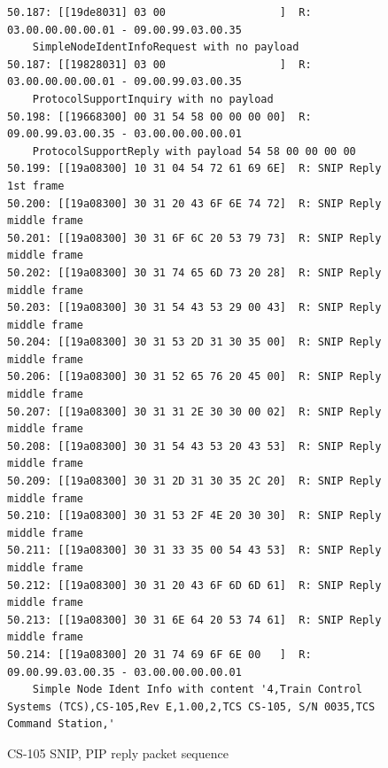 \documentclass[11pt]{article}
\begin{document}
\begin{figure}[!htbp]
\begin{verbatim}
50.187: [[19de8031] 03 00                  ]  R: 03.00.00.00.00.01 - 09.00.99.03.00.35 
    SimpleNodeIdentInfoRequest with no payload
50.187: [[19828031] 03 00                  ]  R: 03.00.00.00.00.01 - 09.00.99.03.00.35 
    ProtocolSupportInquiry with no payload
50.198: [[19668300] 00 31 54 58 00 00 00 00]  R: 09.00.99.03.00.35 - 03.00.00.00.00.01 
    ProtocolSupportReply with payload 54 58 00 00 00 00
50.199: [[19a08300] 10 31 04 54 72 61 69 6E]  R: SNIP Reply 1st frame
50.200: [[19a08300] 30 31 20 43 6F 6E 74 72]  R: SNIP Reply middle frame
50.201: [[19a08300] 30 31 6F 6C 20 53 79 73]  R: SNIP Reply middle frame
50.202: [[19a08300] 30 31 74 65 6D 73 20 28]  R: SNIP Reply middle frame
50.203: [[19a08300] 30 31 54 43 53 29 00 43]  R: SNIP Reply middle frame
50.204: [[19a08300] 30 31 53 2D 31 30 35 00]  R: SNIP Reply middle frame
50.206: [[19a08300] 30 31 52 65 76 20 45 00]  R: SNIP Reply middle frame
50.207: [[19a08300] 30 31 31 2E 30 30 00 02]  R: SNIP Reply middle frame
50.208: [[19a08300] 30 31 54 43 53 20 43 53]  R: SNIP Reply middle frame
50.209: [[19a08300] 30 31 2D 31 30 35 2C 20]  R: SNIP Reply middle frame
50.210: [[19a08300] 30 31 53 2F 4E 20 30 30]  R: SNIP Reply middle frame
50.211: [[19a08300] 30 31 33 35 00 54 43 53]  R: SNIP Reply middle frame
50.212: [[19a08300] 30 31 20 43 6F 6D 6D 61]  R: SNIP Reply middle frame
50.213: [[19a08300] 30 31 6E 64 20 53 74 61]  R: SNIP Reply middle frame
50.214: [[19a08300] 20 31 74 69 6F 6E 00   ]  R: 09.00.99.03.00.35 - 03.00.00.00.00.01 
    Simple Node Ident Info with content '4,Train Control Systems (TCS),CS-105,Rev E,1.00,2,TCS CS-105, S/N 0035,TCS Command Station,'
\end{verbatim}
\caption{CS-105 SNIP, PIP reply packet sequence}
\label{fig:CS105_SNIP_PIP_reply_sequence}
\end{figure}
\end{document}
